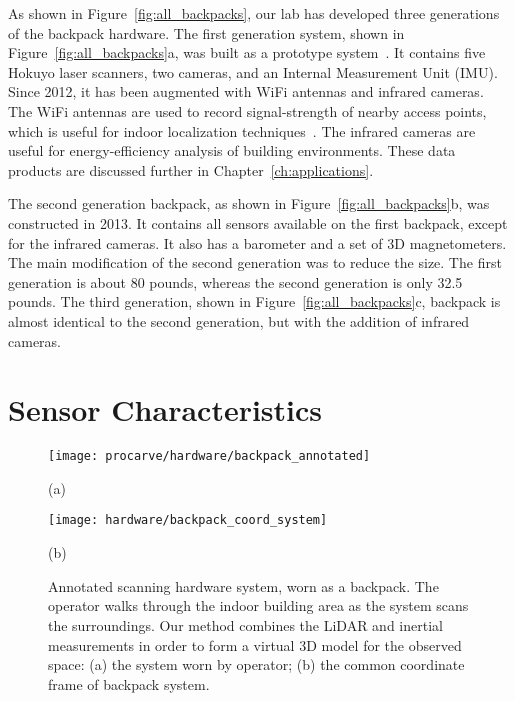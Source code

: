 \documentclass[12pt,onecolumn,oneside]{book}
\begin{document}
As shown in Figure~\ref{fig:all_backpacks}, our lab has developed three generations of the backpack hardware.  The first generation system, shown in Figure~\ref{fig:all_backpacks}a, was built as a prototype system~\cite{Backpack}.  It contains five Hokuyo laser scanners, two cameras, and an Internal Measurement Unit (IMU).  Since 2012, it has been augmented with WiFi antennas and infrared cameras.  The WiFi antennas are used to record signal-strength of nearby access points, which is useful for indoor localization techniques~\cite{Levchev14}.  The infrared cameras are useful for energy-efficiency analysis of building environments.  These data products are discussed further in Chapter~\ref{ch:applications}.

The second generation backpack, as shown in Figure~\ref{fig:all_backpacks}b, was constructed in 2013.  It contains all sensors available on the first backpack, except for the infrared cameras.  It also has a barometer and a set of 3D magnetometers.  The main modification of the second generation was to reduce the size.  The first generation is about 80 pounds, whereas the second generation is only 32.5 pounds.  The third generation, shown in Figure~\ref{fig:all_backpacks}c, backpack is almost identical to the second generation, but with the addition of infrared cameras.

\section{Sensor Characteristics}
\label{sec:sensor_specs}

\begin{figure}[t]

	\begin{minipage}[c]{0.54\linewidth}
		\centerline{\texttt{[image: procarve/hardware/backpack\_annotated]}}
		\centerline{(a)}\medskip
	\end{minipage}
	\hfill
	\begin{minipage}[c]{0.46\linewidth}
		\centerline{\texttt{[image: hardware/backpack\_coord\_system]}}
		\centerline{(b)}\medskip
	\end{minipage}

	\caption[Annotated scanning hardware system.]{Annotated scanning hardware system, worn as a backpack.  The operator walks through the indoor building area as the system scans the surroundings.  Our method combines the LiDAR and inertial measurements in order to form a virtual 3D model for the observed space:  (a) the system worn by operator; (b) the common coordinate frame of backpack system.}
	\label{fig:backpack}
\end{figure}
\end{document}
